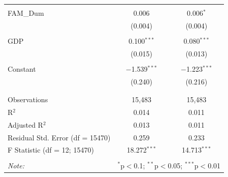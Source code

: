\documentclass[a4paper]{article}\usepackage[]{graphicx}\usepackage[]{color}
\begin{document}
\begin{table}[!htbp]
\begin{tabular}{@{\extracolsep{5pt}}lcc}
  & & \\ 
 FAM\_Dum & 0.006 & 0.006$^{*}$ \\ 
  & (0.004) & (0.004) \\ 
  & & \\ 
 GDP & 0.100$^{***}$ & 0.080$^{***}$ \\ 
  & (0.015) & (0.013) \\ 
  & & \\ 
 Constant & $-$1.539$^{***}$ & $-$1.223$^{***}$ \\ 
  & (0.240) & (0.216) \\ 
  & & \\ 
\hline \\[-1.8ex] 
Observations & 15,483 & 15,483 \\ 
R$^{2}$ & 0.014 & 0.011 \\ 
Adjusted R$^{2}$ & 0.013 & 0.011 \\ 
Residual Std. Error (df = 15470) & 0.259 & 0.233 \\ 
F Statistic (df = 12; 15470) & 18.272$^{***}$ & 14.713$^{***}$ \\ 
\hline 
\hline \\[-1.8ex] 
\textit{Note:}  & \multicolumn{2}{r}{$^{*}$p$<$0.1; $^{**}$p$<$0.05; $^{***}$p$<$0.01} \\ 
\end{tabular} 
\end{table} 


\newpage
\end{document}
